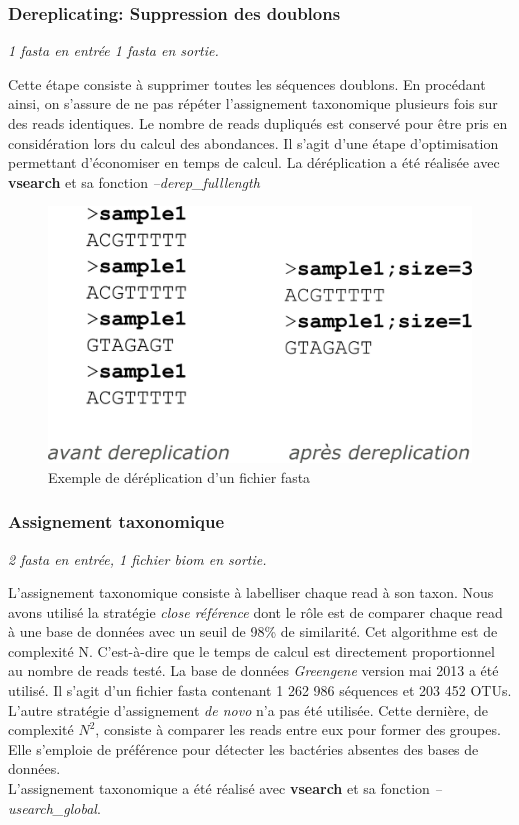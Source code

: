 \documentclass[12pt,a4paper]{article}
\begin{document}
\subsubsection{Dereplicating: Suppression des doublons}
\noindent\emph{1 fasta en entrée 1 fasta en sortie. }

Cette étape consiste à supprimer toutes les séquences doublons. En procédant ainsi, on s'assure de ne pas répéter l'assignement taxonomique plusieurs fois sur des reads identiques. Le nombre de reads dupliqués est conservé pour être pris en considération lors du calcul des abondances. Il s'agit d'une étape d'optimisation permettant d'économiser en temps de calcul. La déréplication a été réalisée avec \textbf{vsearch}\cite{TorbjornRognes2015} et sa fonction \textit{--derep\_fulllength }

\begin{figure}[ht]
\begin{center}
\includegraphics[scale=0.4]{img/dereplication.png}\hfill
\end{center}
\caption{Exemple de déréplication d'un fichier fasta}
\label{dereplication}
\end{figure}

\subsubsection{Assignement taxonomique}
\noindent\emph{2 fasta en entrée,  1 fichier biom  en sortie. }

L’assignement taxonomique consiste à labelliser chaque read à son taxon. Nous avons utilisé la stratégie \textit{close référence} dont le rôle est de comparer chaque read à une base de données avec un seuil de 98\% de similarité. Cet algorithme est de complexité N. C'est-à-dire que le temps de calcul est directement proportionnel au nombre de reads testé. La base de données \textit{Greengene}\cite{DeSantis2006} version mai 2013  a été utilisé. Il s'agit d'un fichier fasta contenant 1 262 986 séquences et 203 452 OTUs. \\
L'autre stratégie d'assignement \textit{de novo} n'a pas été utilisée. Cette dernière, de complexité $N^{2}$, consiste à comparer les reads entre eux pour former des groupes. Elle s'emploie de préférence pour détecter les bactéries absentes des bases de données. \\
L'assignement taxonomique a été réalisé avec \textbf{vsearch} et sa fonction \textit{--usearch\_global}.
\end{document}
